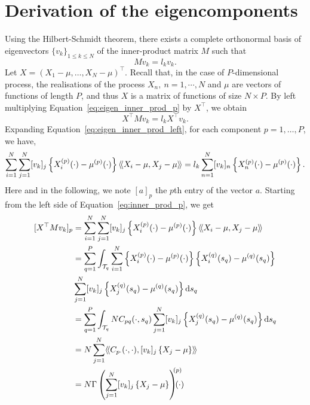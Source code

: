 \section{Derivation of the eigencomponents} %
\label{sec:derivation_of_the_eigencomponents}

Using the Hilbert-Schmidt theorem, there exists a complete orthonormal basis of eigenvectors $\{v_k\}_{1 \leq k \leq N}$ of the inner-product matrix $M$ such that
\begin{equation}\label{eq:eigen_inner_prod_p}
    Mv_k = l_kv_k.
\end{equation}
Let $X = \left(X_1 - \mu, \dots, X_N - \mu\right)^\top$. Recall that, in the case of $P$-dimensional process, the realisations of the process $X_n,~n = 1, \cdots, N$ and $\mu$ are vectors of functions of length $P$, and thus $X$ is a matrix of functions of size $N \times P$. By left multiplying Equation~\eqref{eq:eigen_inner_prod_p} by $X^\top$, we obtain
\begin{equation}\label{eq:eigen_inner_prod_left}
    X^\top M v_k = l_k X^\top v_k.
\end{equation} 
Expanding Equation~\eqref{eq:eigen_inner_prod_left}, for each component $p = 1, \dots, P$, we have,
\begin{equation}\label{eq:inner_prod_p}
    \sum_{i = 1}^N \sum_{j = 1}^N [v_{k}]_j\left\{X_i^{(p)}(\cdot) - \mu^{(p)}(\cdot)\right\}\langle\!\langle X_i - \mu, X_j - \mu\rangle\!\rangle = l_k \sum_{n = 1}^N [v_{k}]_n\left\{X_n^{(p)}(\cdot) - \mu^{(p)}(\cdot)\right\}.
\end{equation}
Here and in the following, we note $[a]_p$ the $p$th entry of the vector $a$. Starting from the left side of Equation~\eqref{eq:inner_prod_p}, we get
\begin{align}\label{eq:inner_prod_p_left}
[X^\top M v_k]_p &= \sum_{i = 1}^N \sum_{j = 1}^N [v_{k}]_j \left\{X_i^{(p)}(\cdot) - \mu^{(p)}(\cdot)\right\}\inH{X_i - \mu}{X_j - \mu}\\
&= \sum_{q = 1}^P \int_{\TT{q}} \sum_{i = 1}^N \left\{X_i^{(p)}(\cdot) - \mu^{(p)}(\cdot)\right\} \left\{X_i^{(q)}(s_q) - \mu^{(q)}(s_q)\right\}  \\
& \sum_{j = 1}^N [v_{k}]_j \left\{X_j^{(q)}(s_q) - \mu^{(q)}(s_q)\right\} \dd s_q \\
&= \sum_{q = 1}^P \int_{\TT{q}} N C_{pq}(\cdot, s_q)\sum_{j = 1}^N [v_{k}]_j \left\{X_j^{(q)}(s_q) - \mu^{(q)}(s_q)\right\} \dd s_q \\
&= N \sum_{j = 1}^N \inH{C_{p \cdot}(\cdot, \cdot)}{[v_{k}]_j \left\{X_j - \mu\right\}} \\
&= N \Gamma\left(\sum_{j = 1}^N [v_{k}]_j \left\{X_j - \mu\right\} \right)^{\mkern-9mu(p)}\mkern-18mu(\cdot)
\end{align}

